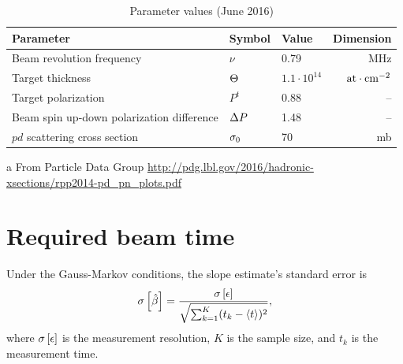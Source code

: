 \documentclass{report}
\begin{document}
\begin{table}
\centering
\caption{Parameter values (June 2016)\label{tbl:Param}}
\begin{threeparttable}[h]
\begin{tabular}{p{4.5cm}llr}
	\hline\hline
	Parameter                                 & Symbol            & Value              &               Dimension \\ \hline
	Beam revolution frequency                 & $\nu$             & 0.79               &                     MHz \\
	Target thickness                          & $\Thick$          & $1.1\cdot 10^{14}$ & $\mathrm{at\cdot cm^{-2}}$ \\
	Target polarization                       & $P^t$             & 0.88               &                      -- \\
	Beam spin up-down polarization difference & $\DP$             & 1.48               &                      -- \\
	$pd$ scattering cross section             & $\CS[0]$\tnote{a} & 70                 &                      mb \\ \hline
\end{tabular}
\begin{tablenotes}
	\item[a]{From Particle Data Group \url{http://pdg.lbl.gov/2016/hadronic-xsections/rpp2014-pd_pn_plots.pdf}}
\end{tablenotes}
\end{threeparttable}
\end{table}

\section{Required beam time}
\newcommand{\Tint}{\Delta t}

Under the Gauss-Markov conditions, the slope estimate's standard error is
\begin{equation}\label{eq:SlpVarGM}
	\SE{\slp*} = \frac{\SE{\err}}{\sqrt{\sum_{k=1}^K (t_k - \avg{t})^2}},
\end{equation}
where $\SE{\err}$ is the measurement resolution, $K$ is the sample size, and $t_k$ is the measurement time.
\end{document}
